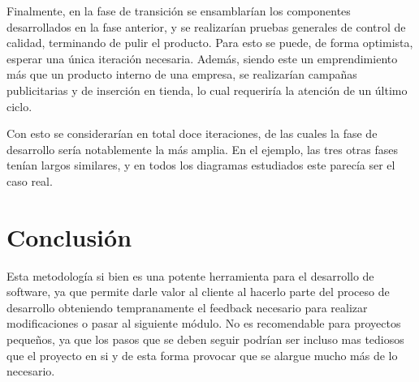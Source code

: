 \documentclass[spanish]{udpreport}
\begin{document}
Finalmente, en la fase de transición se ensamblarían los componentes desarrollados en la fase anterior, y se realizarían pruebas generales de control de calidad, terminando de pulir el producto. Para esto se puede, de forma optimista, esperar una única iteración necesaria. Además, siendo este un emprendimiento más que un producto interno de una empresa, se realizarían campañas publicitarias y de inserción en tienda, lo cual requeriría la atención de un último ciclo. \par
Con esto se considerarían en total doce iteraciones, de las cuales la fase de desarrollo sería notablemente la más amplia. En el ejemplo, las tres otras fases tenían largos similares, y en todos los diagramas estudiados este parecía ser el caso real.

\chapter{Conclusión}
Esta metodología si bien es una potente herramienta para el desarrollo de software, ya que permite darle valor al cliente al hacerlo parte del proceso de desarrollo obteniendo tempranamente el feedback necesario para realizar modificaciones o pasar al siguiente módulo. No es recomendable para proyectos pequeños, ya que los pasos que se deben seguir podrían ser incluso mas tediosos que el proyecto en si y de esta forma provocar que se alargue mucho más de lo necesario.

\end{document}
